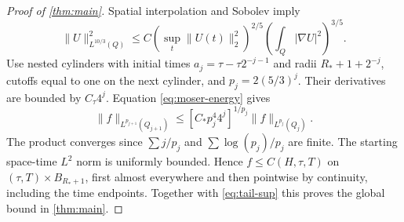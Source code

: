 \begin{proof}[Proof of \cref{thm:main}]
Spatial interpolation and Sobolev imply
\[
 \|U\|_{L^{10/3}(Q)}^2
 \le C(\sup_t\|U(t)\|_2^2)^{2/5}
       \left(\int_Q|\nabla U|^2\right)^{3/5}.
\]
Use nested cylinders with initial times $a_j=\tau-\tau2^{-j-1}$ and radii $R_*+1+2^{-j}$, cutoffs equal to one on the next cylinder, and $p_j=2(5/3)^j$. Their derivatives are bounded by $C_\tau4^j$. Equation \eqref{eq:moser-energy} gives
\[
 \|f\|_{L^{p_{j+1}}(Q_{j+1})}
 \le[C_*p_j^4 4^j]^{1/p_j}\|f\|_{L^{p_j}(Q_j)}.
\]
The product converges since $\sum j/p_j$ and $\sum\log(p_j)/p_j$ are finite. The starting space-time $L^2$ norm is uniformly bounded. Hence $f\le C(H,\tau,T)$ on $(\tau,T)\times B_{R_*+1}$, first almost everywhere and then pointwise by continuity, including the time endpoints. Together with \eqref{eq:tail-sup} this proves the global bound in \cref{thm:main}.
\end{proof}
